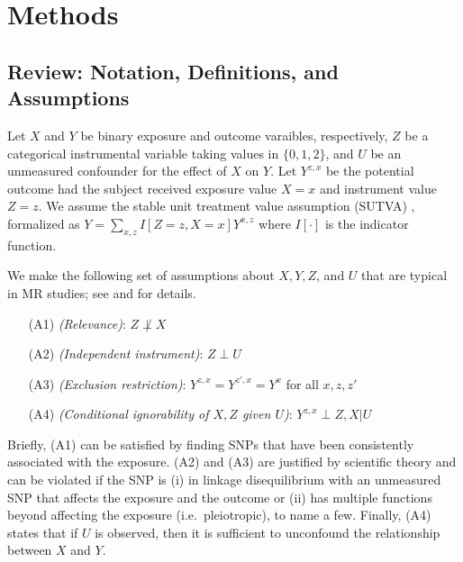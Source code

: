\documentclass[
]{article}
\providecommand{\tightlist}{%
  \setlength{\itemsep}{0pt}\setlength{\parskip}{0pt}}
\theoremstyle{plain}
\begin{document}
\hypertarget{methods}{%
\section{\texorpdfstring{Methods \label{setup}}{Methods }}\label{methods}}

\hypertarget{review-notation-definitions-and-assumptions}{%
\subsection{Review: Notation, Definitions, and Assumptions}\label{review-notation-definitions-and-assumptions}}

\label{notation-and-definitions}

Let \(X\) and \(Y\) be binary exposure and outcome varaibles, respectively, \(Z\) be a categorical instrumental variable taking values in \(\{0, 1, 2\}\), and \(U\) be an unmeasured confounder for the effect of \(X\) on \(Y\). Let \(Y^{z,x}\) be the potential outcome \autocite{rubin_estimating_1974,splawa-neyman_application_1990} had the subject received exposure value \(X = x\) and instrument value \(Z = z\). We assume the stable unit treatment value assumption (SUTVA) \autocite{cox_planning_1958,rubin_randomization_1980}, formalized as \(Y = \sum_{x,z} I[Z = z, X = x] Y^{x,z}\) where \(I[\cdot]\) is the indicator function.

We make the following set of assumptions about \(X, Y, Z\), and \(U\) that are typical in MR studies; see \textcite{didelez_mendelian_2007} and \textcite{wang_bounded_2018} for details.

\begin{itemize}
\tightlist
\item[(A1)] \emph{(Relevance)}: $Z \not\perp X$ 
\item[(A2)] \emph{(Independent instrument)}: $Z \perp U$
\item[(A3)] \emph{(Exclusion restriction)}: $Y^{z,x} = Y^{z',x} = Y^{x}$ for all $x,z,z'$
\item[(A4)] \emph{(Conditional ignorability of $X,Z$ given $U$)}: $Y^{z,x} \perp Z, X | U$
\end{itemize}

Briefly, (A1) can be satisfied by finding SNPs that have been consistently associated with the exposure. (A2) and (A3) are justified by scientific theory and can be violated if the SNP is (i) in linkage disequilibrium with an unmeasured SNP that affects the exposure and the outcome or (ii) has multiple functions beyond affecting the exposure (i.e.~pleiotropic), to name a few. Finally, (A4) states that if \(U\) is observed, then it is sufficient to unconfound the relationship between \(X\) and \(Y\).
\end{document}
